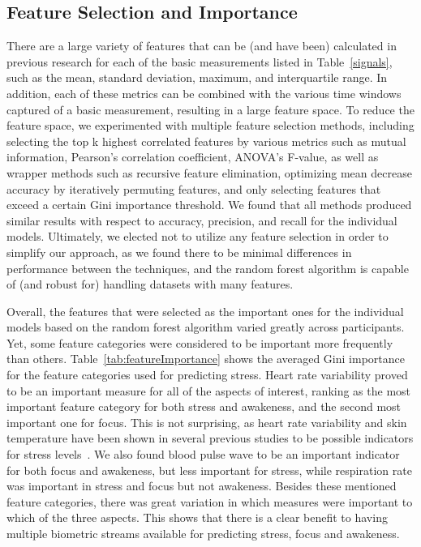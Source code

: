 \subsection{Feature Selection and Importance}
There are a large variety of features that can be (and have been) calculated in previous research for each of the basic measurements listed in Table~\ref{signals}, such as the mean, standard deviation, maximum, and interquartile range. In addition, each of these metrics can be combined with the various time windows captured of a basic measurement, resulting in a large feature space. To reduce the feature space, we experimented with multiple feature selection methods, including selecting the top k highest correlated features by various metrics such as mutual information, Pearson's correlation coefficient, ANOVA's F-value, as well as wrapper methods such as recursive feature elimination, optimizing mean decrease accuracy by iteratively permuting features, and only selecting features that exceed a certain Gini importance threshold. We found that all methods produced similar results with respect to accuracy, precision, and recall for the individual models. Ultimately, we elected not to utilize any feature selection in order to simplify our approach, as we found there to be minimal differences in performance between the techniques, and the random forest algorithm is capable of (and robust for) handling datasets with many features.

Overall, the features that were selected as the important ones for the individual models based on the random forest algorithm varied greatly across participants. Yet, some feature categories were considered to be important more frequently than others. Table~\ref{tab:featureImportance} shows the averaged Gini importance for the feature categories used for predicting stress. Heart rate variability proved to be an important measure for all of the aspects of interest, ranking as the most important feature category for both stress and awakeness, and the second most important one for focus. This is not surprising, as heart rate variability and skin temperature have been shown in several previous studies to be possible indicators for stress levels~\cite{dishman2000stress,mcduff16,kataoka00}. We also found blood pulse wave to be an important indicator for both focus and awakeness, but less important for stress, while respiration rate was important in stress and focus but not awakeness. Besides these mentioned feature categories, there was great variation in which measures were important to which of the three aspects. This shows that there is a clear benefit to having multiple biometric streams available for predicting stress, focus and awakeness.\\[-0.1cm]


